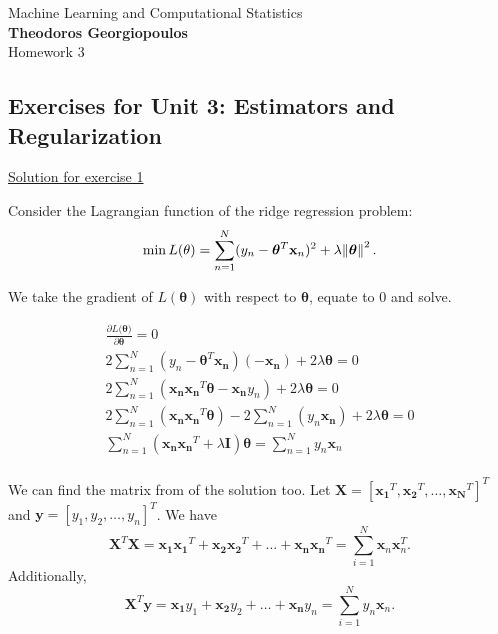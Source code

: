 \documentclass[12pt]{book}
\begin{document}
\begin{center}
{\Large Machine Learning and Computational Statistics}\\
\large\textbf{Theodoros Georgiopoulos}\\ %
\Large Homework 3 %
\end{center}

\vspace{0.2 cm}
\subsection*{Exercises for Unit 3: Estimators and Regularization}
\vspace{0.2 cm}

{\underline{\large Solution for exercise 1}}
\vspace{0.1 cm}

\noindent
Consider the Lagrangian function of the ridge regression problem:
\begin{equation}
\min L(\theta) = \sum_{n=1}^{N}(y_n-\bm{\theta}^T\mathbf{x}_n)^2 + \lambda \norm{\bm{\theta}}^2.
\end{equation}

We take the gradient of $L(\bm{\theta})$ with respect to $\bm{\theta}$, equate to $0$ and solve.

\begin{align}
\frac{\partial L(\bm{\theta)}}{\partial \bm{\theta}} = 0 \nonumber \\ 
2\sum_{n=1}^{N}(y_n-\bm{\theta}^T \mathbf{x_n})(-\mathbf{x_n}) + 2\lambda\bm{\theta} = 0 \nonumber \\
2 \sum_{n=1}^{N}(\mathbf{x_n}\mathbf{x_n}^T\bm{\theta} - \mathbf{x_n}y_n) + 2\lambda\bm{\theta} = 0 \nonumber \\
2 \sum_{n=1}^{N}(\mathbf{x_n}\mathbf{x_n}^T\bm{\theta}) - 2 \sum_{n=1}^{N}(y_n\mathbf{x_n}) + 2\lambda\bm{\theta} = 0 \nonumber \\
\sum_{n=1}^{N}(\mathbf{x_n}\mathbf{x_n}^T + \lambda \mathbf{I} )\bm{\theta} = \sum_{n=1}^{N}y_n\mathbf{x}_n
\end{align}
\\
We can find the matrix from of the solution too. Let $\bm{X} = [\bm{x_1}^T,\bm{x_2}^T,\dots,\bm{x_N}^T]^T$ and $\bm{y}=[y_1,y_2,\dots,y_n]^T$. We have
\begin{equation*}
\bm{X}^T\bm{X} = \bm{x_1x_1}^T + \bm{x_2x_2}^T + \dots + \bm{x_nx_n}^T = \sum_{i=1}^{N}\bm{x}_n\bm{x}_n^T.
\end{equation*}
Additionally,
\begin{equation*}
\bm{X}^T\bm{y} = \bm{x_1}y_1 + \bm{x_2}y_2 + \dots + \bm{x_n}y_n = \sum_{i=1}^{N}y_n\bm{x}_n.
\end{equation*}
\end{document}
